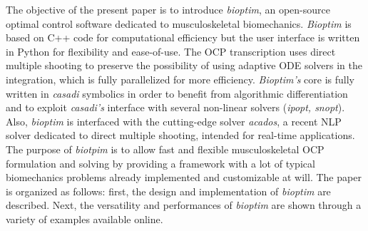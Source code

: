 

The objective of the present paper is to introduce \textit{bioptim}, an open-source optimal control software dedicated to musculoskeletal biomechanics.
\textit{Bioptim} is based on C++ code for computational efficiency but the user interface is written in Python for flexibility and ease-of-use. 
The OCP transcription uses direct multiple shooting to preserve the possibility of using adaptive ODE solvers in the integration, which is fully parallelized for more efficiency.
\textit{Bioptim's} core is fully written in \textit{casadi} symbolics in order to benefit from algorithmic differentiation and to exploit \textit{casadi's} interface with several non-linear solvers (\textit{ipopt, snopt}).
Also, \textit{bioptim} is interfaced with the cutting-edge solver \textit{acados}, a recent NLP solver dedicated to direct multiple shooting, intended for real-time applications.
The purpose of \textit{biotpim} is to allow fast and flexible musculoskeletal OCP formulation and solving by providing a framework with a lot of typical biomechanics problems already implemented and customizable at will.
The paper is organized as follows: first, the design and implementation of \textit{bioptim} are described.
Next, the versatility and performances of \textit{bioptim} are shown through a variety of examples available online. 

